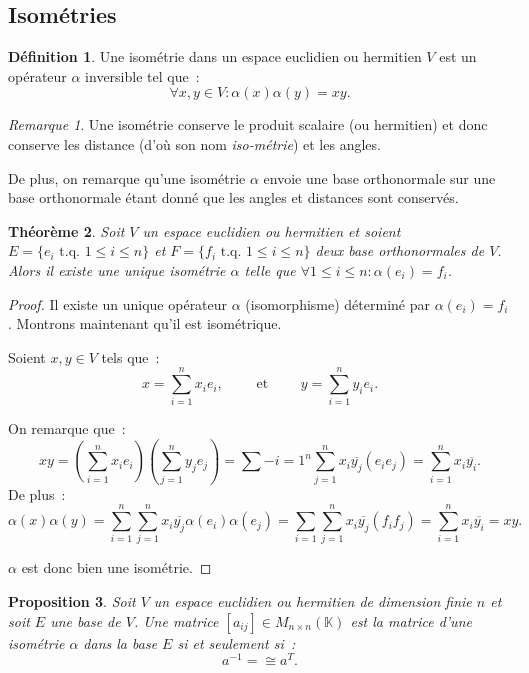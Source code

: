 \documentclass{article}
\newcommand{\K}{\mathbb K}
\newcommand{\M}[3]{M_{#1 \times #2}(#3)}
\newcommand{\tq}{\textrm{ t.q. }}
\newcommand{\conj}[1]{\overline {#1}}
\newtheorem{thm}{Théorème}[section]
\newtheorem{prp}[thm]{Proposition}
\theoremstyle{definition}
\newtheorem{déf}[thm]{Définition}
\theoremstyle{remark}
\newtheorem*{rmq}{Remarque}
\begin{document}
	\subsection{Isométries}
		\begin{déf} Une isométrie dans un espace euclidien ou hermitien $V$ est un opérateur $\alpha$ inversible tel que~:
		\[\forall x, y \in V : \alpha(x)\alpha(y) = xy.\]
		\end{déf}

		\begin{rmq} Une isométrie conserve le produit scalaire (ou hermitien) et donc conserve les distance (d'où son nom \emph{iso-métrie}) et les angles.

		De plus, on remarque qu'une isométrie $\alpha$ envoie une base orthonormale sur une base orthonormale étant donné que les angles et distances sont
		conservés.
		\end{rmq}

		\begin{thm} Soit $V$ un espace euclidien ou hermitien et soient $E = \{e_i \tq 1 \leq i \leq n\}$ et $F = \{f_i \tq 1 \leq i \leq n\}$ deux base
		orthonormales de $V$. Alors il existe une unique isométrie $\alpha$ telle que $\forall 1 \leq i \leq n : \alpha(e_i) = f_i$.
		\end{thm}

		\begin{proof} Il existe un unique opérateur $\alpha$ (isomorphisme) déterminé par $\alpha(e_i) = f_i$. Montrons maintenant qu'il est isométrique.

		Soient $x, y \in V$ tels que~:
		\[x = \sum_{i=1}^nx_ie_i,\qquad\textrm{ et }\qquad y = \sum_{i=1}^ny_ie_i.\]

		On remarque que~:
		\[xy = \left(\sum_{i=1}^nx_ie_i\right)\left(\sum_{j=1}^ny_je_j\right) = \sum-{i=1}^n\sum_{j=1}^nx_i\conj {y_j}(e_ie_j) = \sum_{i=1}^nx_i\conj {y_i}.\]
		De plus~:
		\[\alpha(x)\alpha(y) = \sum_{i=1}^n\sum_{j=1}^nx_i\conj{y_j}\alpha(e_i)\alpha(e_j) = \sum_{i=1}\sum_{j=1}^nx_i\conj{y_j}(f_if_j)
		= \sum_{i=1}^nx_i\conj{y_i} = xy.\]

		$\alpha$ est donc bien une isométrie.
		\end{proof}

		\begin{prp} Soit $V$ un espace euclidien ou hermitien de dimension finie $n$ et soit $E$ une base de $V$. Une matrice $[a_{ij}] \in \M nn\K$ est la
		matrice d'une isométrie $\alpha$ dans la base $E$ si et seulement si~:
		\[a^{-1} = \cong a^T.\]
		\end{prp}
\end{document}
